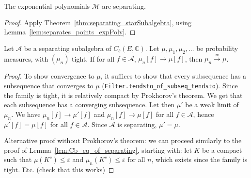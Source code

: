 \begin{lemma}\label{lem:separating_expPoly}
The exponential polynomials $\mathcal M$ are separating.
\end{lemma}

\begin{proof}
Apply Theorem~\ref{thm:separating_starSubalgebra}, using Lemma~\ref{lem:separates_points_expPoly}.
\end{proof}

\begin{lemma}\label{lem:cvg_of_separating}
Let $\mathcal A$ be a separating subalgebra of $C_b(E, \mathbb{C})$. Let $\mu, \mu_1, \mu_2, \ldots$ be probability measures, with $(\mu_n)$ tight. If for all $f \in \mathcal A$, $\mu_n[f] \to \mu[f]$, then $\mu_n \xrightarrow{w} \mu$.
\end{lemma}

\begin{proof}
To show convergence to $\mu$, it suffices to show that every subsequence has a subsequence that converges to $\mu$ (\texttt{Filter.tendsto\_of\_subseq\_tendsto}).
Since the family is tight, it is relatively compact by Prokhorov's theorem. We get that each subsequence has a converging subsequence.
Let then $\mu'$ be a weak limit of $\mu_n$. We have $\mu_n[f] \to \mu'[f]$ and $\mu_n[f] \to \mu[f]$ for all $f \in \mathcal A$, hence $\mu'[f] = \mu[f]$ for all $f \in \mathcal A$. Since $\mathcal A$ is separating, $\mathcal \mu' = \mu$.

Alternative proof without Prokhorov's theorem: we can proceed similarly to the proof of Lemma~\ref{lem:Cb_eq_of_separating}, starting with: let $K$ be a compact such that $\mu(K^c) \le \varepsilon$ and $\mu_n(K^c) \le \varepsilon$ for all $n$, which exists since the family is tight. Etc. (check that this works)
\end{proof}
